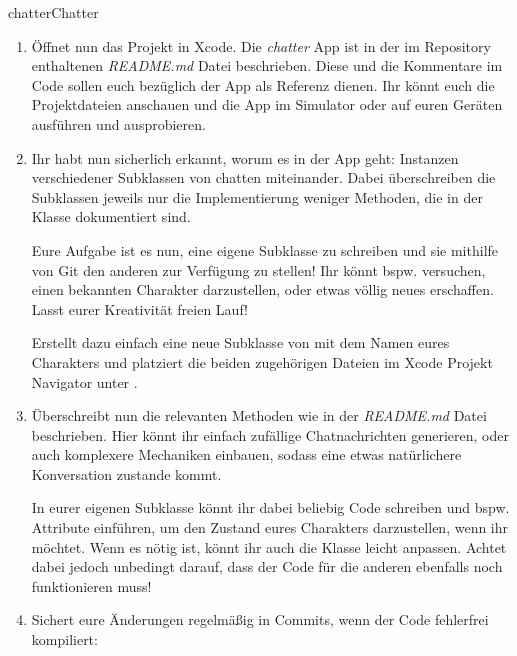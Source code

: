 \documentclass[parskip=half, final]{scrreprt}
\begin{document}
\begin{lecture}
\begin{exc}
\begin{excitem}{chatter}{Chatter}
\begin{enumerate}[label=\roman*.]
\begin{shlst}
git pull --rebase upstream master # Ein Rebase ist hier angebrachter als ein Merge, im Skript ist der Unterschied kurz beschrieben
\end{shlst}

Dies solltet ihr häufig tun, unter anderem immer bevor ihr beginnt, an dem Projekt zu arbeiten.

\item Öffnet nun das Projekt in Xcode. Die \emph{chatter} App ist in der im Repository enthaltenen \emph{README.md} Datei beschrieben. Diese und die Kommentare im Code sollen euch bezüglich der App als Referenz dienen. Ihr könnt euch die Projektdateien anschauen und die App im Simulator oder auf euren Geräten ausführen und ausprobieren.

\item Ihr habt nun sicherlich erkannt, worum es in der App geht: Instanzen verschiedener Subklassen von  chatten miteinander. Dabei überschreiben die Subklassen jeweils nur die Implementierung weniger Methoden, die in der  Klasse dokumentiert sind.

Eure Aufgabe ist es nun, eine eigene Subklasse zu schreiben und sie mithilfe von Git den anderen zur Verfügung zu stellen! Ihr könnt bspw. versuchen, einen bekannten Charakter darzustellen, oder etwas völlig neues erschaffen. Lasst eurer Kreativität freien Lauf!

Erstellt dazu einfach eine neue Subklasse von  mit dem Namen eures Charakters und platziert die beiden zugehörigen Dateien im Xcode Projekt Navigator unter .

\item Überschreibt nun die relevanten Methoden wie in der \emph{README.md} Datei beschrieben. Hier könnt ihr einfach zufällige Chatnachrichten generieren, oder auch komplexere Mechaniken einbauen, sodass eine etwas natürlichere Konversation zustande kommt.

In eurer eigenen Subklasse könnt ihr dabei beliebig Code schreiben und bspw. Attribute einführen, um den Zustand eures Charakters darzustellen, wenn ihr möchtet. Wenn es nötig ist, könnt ihr auch die  Klasse leicht anpassen. Achtet dabei jedoch unbedingt darauf, dass der Code für die anderen ebenfalls noch funktionieren muss!

\item Sichert eure Änderungen regelmäßig in Commits, wenn der Code fehlerfrei kompiliert:


\end{enumerate}
\end{excitem}
\end{exc}
\end{lecture}
\end{document}
